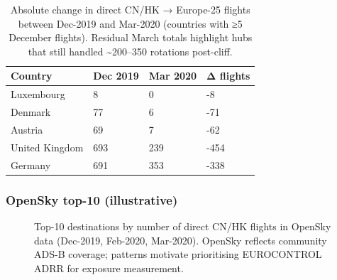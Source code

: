 \documentclass[
  authoryear,
  preprint,
  3p,
  onecolumn]{elsarticle}
\begin{document}
\begin{longtable}[]{@{}llll@{}}

\caption{\label{tbl-collapse}Absolute change in direct CN/HK → Europe-25
flights between Dec-2019 and Mar-2020 (countries with ≥5 December
flights). Residual March totals highlight hubs that still handled
\textasciitilde200--350 rotations post-cliff.}

\tabularnewline

\toprule\noalign{}
Country & Dec 2019 & Mar 2020 & Δ flights \\
\midrule\noalign{}
\endhead
\bottomrule\noalign{}
\endlastfoot
Luxembourg & 8 & 0 & -8 \\
Denmark & 77 & 6 & -71 \\
Austria & 69 & 7 & -62 \\
United Kingdom & 693 & 239 & -454 \\
Germany & 691 & 353 & -338 \\

\end{longtable}

\clearpage

\subsubsection{OpenSky top-10
(illustrative)}\label{opensky-top-10-illustrative}

\begin{figure}


\caption{\label{fig-opensky-bar}Top-10 destinations by number of direct
CN/HK flights in OpenSky data (Dec-2019, Feb-2020, Mar-2020). OpenSky
reflects community ADS-B coverage; patterns motivate prioritising
EUROCONTROL ADRR for exposure measurement.}

\end{figure}%
\end{document}
